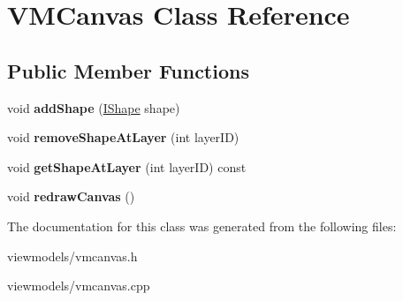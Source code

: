 \hypertarget{class_v_m_canvas}{}\section{V\+M\+Canvas Class Reference}
\label{class_v_m_canvas}
\subsection*{Public Member Functions}
\begin{DoxyCompactItemize}
\item 
\mbox{\label{class_v_m_canvas_a8af06e745cc7fcaa0e47663ee80cfd26}} 
void {\bfseries add\+Shape} (\mbox{\hyperlink{class_i_shape}{I\+Shape}} shape)
\item 
\mbox{\label{class_v_m_canvas_a58092a70072af434ce7f712eff21c187}} 
void {\bfseries remove\+Shape\+At\+Layer} (int layer\+ID)
\item 
\mbox{\label{class_v_m_canvas_a79d65c28c7d086c06c35f666f4fe2c99}} 
void {\bfseries get\+Shape\+At\+Layer} (int layer\+ID) const
\item 
\mbox{\label{class_v_m_canvas_a3b4370532015298047d1520e37420718}} 
void {\bfseries redraw\+Canvas} ()
\end{DoxyCompactItemize}


The documentation for this class was generated from the following files\+:\begin{DoxyCompactItemize}
\item 
viewmodels/vmcanvas.\+h\item 
viewmodels/vmcanvas.\+cpp\end{DoxyCompactItemize}
